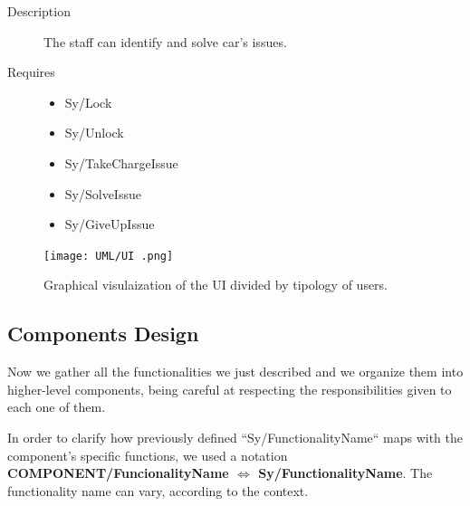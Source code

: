 \documentclass[11pt]{article} %
\begin{document}
\begin{description}
\begin{description}
		\item[Description] The staff can identify and solve car’s issues.
		\item[Requires] \hfill
		\begin{itemize}
			\item Sy/Lock %
			\item Sy/Unlock %
			\item Sy/TakeChargeIssue  %
			\item Sy/SolveIssue %
			\item Sy/GiveUpIssue %
		\end{itemize}
	\end{description}
\end{description}


\begin{figure}[H]
	\centering
	\texttt{[image: UML/UI
.png]}
	\caption{Graphical visulaization of the UI divided by tipology of users.}
\end{figure}	


\subsection{Components Design}

Now we gather all the functionalities we just described and we organize them into higher-level components, being careful at respecting the responsibilities given to each one of them.

In order to clarify how previously defined ``Sy/FunctionalityName`` maps with the component's specific functions, we used a notation \textbf{COMPONENT/FuncionalityName $\Leftrightarrow$ Sy/FunctionalityName}. The functionality name can vary, according to the context.
\end{document}
